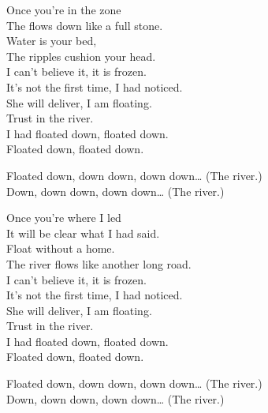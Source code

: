 
\label{album:quarters}





Once you're in the zone \\
The  flows down like a full stone. \\
Water is your bed, \\
The ripples cushion your head. \\

I can't believe it, it is frozen. \\
It's not the first time, I had noticed. \\
She will deliver, I am floating. \\
Trust in the river. \\
I had floated down, floated down. \\
Floated down, floated down. \\


Floated down, down down, down down… (The river.) \\
Down, down down, down down… (The river.) \\


Once you're where I led \\
It will be clear what I had said. \\
Float without a home. \\
The river flows like another long road. \\

I can't believe it, it is frozen. \\
It's not the first time, I had noticed. \\
She will deliver, I am floating. \\
Trust in the river. \\
I had floated down, floated down. \\
Floated down, floated down. \\


Floated down, down down, down down… (The river.) \\
Down, down down, down down… (The river.) \\

